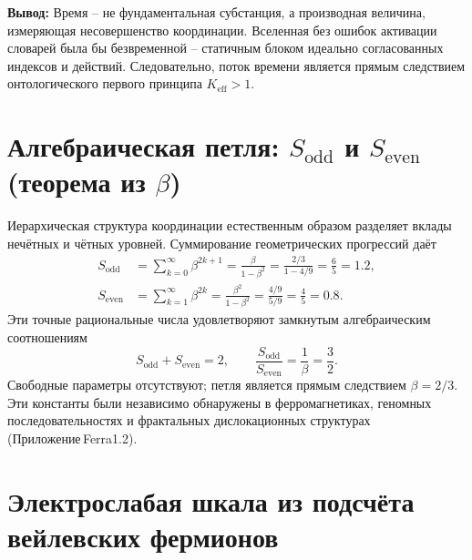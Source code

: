 \documentclass[11pt,a4paper]{article}
\begin{document}
	\noindent
	\textbf{Вывод:} Время – не фундаментальная субстанция, а производная величина, измеряющая несовершенство координации.  Вселенная без ошибок активации словарей была бы безвременной – статичным блоком идеально согласованных индексов и действий.  Следовательно, поток времени является прямым следствием онтологического первого принципа \(K_{\mathrm{eff}} > 1\).
	
	\section{Алгебраическая петля: \(S_{\mathrm{odd}}\) и \(S_{\mathrm{even}}\) (теорема из \(\beta\))}\label{sec:algebraic-loop}
	
	Иерархическая структура координации естественным образом разделяет вклады нечётных и чётных уровней.  Суммирование геометрических прогрессий даёт
	\begin{align}
		S_{\mathrm{odd}} &= \sum_{k=0}^{\infty} \beta^{2k+1} = \frac{\beta}{1-\beta^{2}} = \frac{2/3}{1 - 4/9} = \frac{6}{5} = 1.2, \label{eq:sodd}\\
		S_{\mathrm{even}} &= \sum_{k=1}^{\infty} \beta^{2k} = \frac{\beta^{2}}{1-\beta^{2}} = \frac{4/9}{5/9} = \frac{4}{5} = 0.8. \label{eq:seven}
	\end{align}
	Эти точные рациональные числа удовлетворяют замкнутым алгебраическим соотношениям
	\begin{equation}
		\boxed{S_{\mathrm{odd}} + S_{\mathrm{even}} = 2, \qquad \frac{S_{\mathrm{odd}}}{S_{\mathrm{even}}} = \frac{1}{\beta} = \frac{3}{2}}.
		\label{eq:algebraic-loop}
	\end{equation}
	Свободные параметры отсутствуют; петля является прямым следствием \(\beta = 2/3\).  Эти константы были независимо обнаружены в ферромагнетиках, геномных последовательностях и фрактальных дислокационных структурах (Приложение Ferra1.2).
	
	\section{Электрослабая шкала из подсчёта вейлевских фермионов}
	
\end{document}
